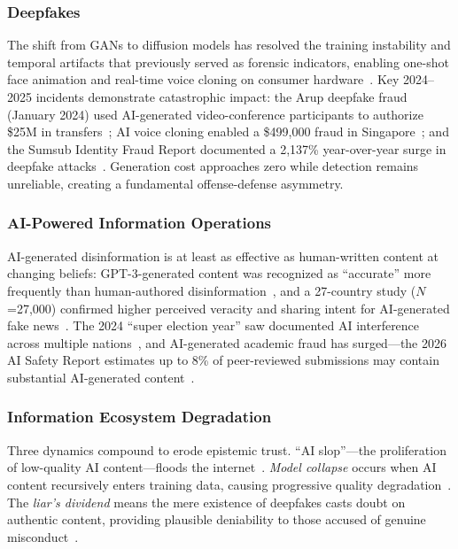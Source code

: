 \subsubsection{Deepfakes}
\label{sec:threat-deepfake}

The shift from GANs to diffusion models has resolved the training instability and temporal artifacts that previously served as forensic indicators, enabling one-shot face animation and real-time voice cloning on consumer hardware~\cite{pei2024deepfakesurvey}. Key 2024--2025 incidents demonstrate catastrophic impact: the Arup deepfake fraud (January 2024) used AI-generated video-conference participants to authorize \$25M in transfers~\cite{wef2025arup}; AI voice cloning enabled a \$499,000 fraud in Singapore~\cite{brightside2025phishing}; and the Sumsub Identity Fraud Report documented a 2,137\% year-over-year surge in deepfake attacks~\cite{sumsub2024}. Generation cost approaches zero while detection remains unreliable, creating a fundamental offense-defense asymmetry.


\subsubsection{AI-Powered Information Operations}
\label{sec:threat-infoop}

AI-generated disinformation is at least as effective as human-written content at changing beliefs: GPT-3-generated content was recognized as ``accurate'' more frequently than human-authored disinformation~\cite{spitale2023gpt3}, and a 27-country study ($N$=27,000) confirmed higher perceived veracity and sharing intent for AI-generated fake news~\cite{stefkovics2026fakenews}. The 2024 ``super election year'' saw documented AI interference across multiple nations~\cite{restofworld2024tracker}, and AI-generated academic fraud has surged---the 2026 AI Safety Report estimates up to 8\% of peer-reviewed submissions may contain substantial AI-generated content~\cite{aisafetyreport2026}.


\subsubsection{Information Ecosystem Degradation}
\label{sec:threat-ecosystem}

Three dynamics compound to erode epistemic trust. ``AI slop''---the proliferation of low-quality AI content---floods the internet~\cite{graphite2025aicontent}. \emph{Model collapse} occurs when AI content recursively enters training data, causing progressive quality degradation~\cite{shumailov2024collapse}. The \emph{liar's dividend} means the mere existence of deepfakes casts doubt on authentic content, providing plausible deniability to those accused of genuine misconduct~\cite{chesney2019deepfakes}.


